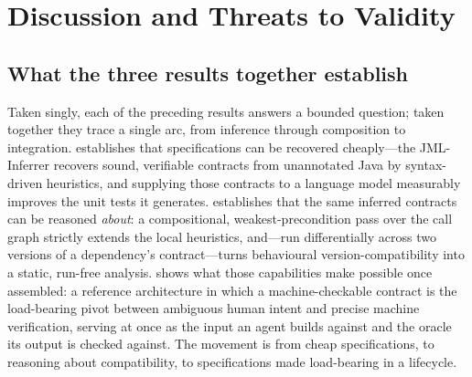 \chapter{Discussion and Threats to Validity}\label{ch:discussion}

\section{What the three results together establish}\label{sec:disc-arc}

Taken singly, each of the preceding results answers a bounded question; taken
together they trace a single arc, from inference through composition to
integration.  establishes that specifications can be recovered
cheaply---the JML-Inferrer recovers sound, verifiable contracts from unannotated
Java by syntax-driven heuristics, and supplying those contracts to a language
model measurably improves the unit tests it generates. 
establishes that the same inferred contracts can be reasoned \emph{about}: a
compositional, weakest-precondition pass over the call graph strictly extends the
local heuristics, and---run differentially across two versions of a dependency's
contract---turns behavioural version-compatibility into a static, run-free
analysis.  shows what those capabilities make possible once
assembled: a reference architecture in which a machine-checkable contract is the
load-bearing pivot between ambiguous human intent and precise machine
verification, serving at once as the input an agent builds against and the oracle
its output is checked against. The movement is from cheap specifications, to
reasoning about compatibility, to specifications made load-bearing in a lifecycle.

